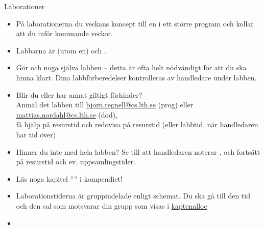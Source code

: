 \begin{SlideExtra}{Laborationer}\SlideFontSmall
\begin{itemize}
\item På laborationerna  du veckans koncept till en  i ett större program och kollar att du  inför kommande veckor.
\item Labbarna är  (utom en) och .

\item Gör  och  noga  själva labben -- detta är ofta helt nödvändigt för att du ska hinna klart. Dina labbförberedelser kontrolleras av handledare under labben.

\item Blir du  eller har annat giltigt förhinder?\\ Anmäl det  labben till \url{bjorn.regnell@cs.lth.se} (prog) eller \url{mattias.nordahl@cs.lth.se} (dod), \\ få hjälp på resurstid och redovisa på resurstid (eller labbtid, när handledaren har tid över)

\item Hinner du inte med hela labben? Se till att handledaren noterar , och fortsätt på resurstid och ev. uppsamlingstider.

\item Läs noga kapitel '''' i kompendiet!

\item Laborationstiderna är gruppindelade enligt schemat. Du ska gå till den tid och den sal som motsvarar din grupp som visas i \href{https://fileadmin.cs.lth.se/pgk/kaptenalloc/}{kaptenalloc}\\
\item {}
\end{itemize}
\end{SlideExtra}




